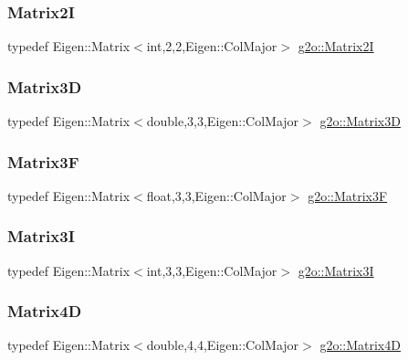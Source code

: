 \subsubsection{\texorpdfstring{Matrix2I}{Matrix2I}}
{\footnotesize\ttfamily typedef Eigen\+::\+Matrix$<$int,2,2,Eigen\+::\+Col\+Major$>$ \mbox{\hyperlink{namespaceg2o_ac9319963099ff600cf7c6251d7e937e1}{g2o\+::\+Matrix2I}}}

\mbox{\label{namespaceg2o_ae968373755b3be75547f97573021dc8a}} 
\subsubsection{\texorpdfstring{Matrix3D}{Matrix3D}}
{\footnotesize\ttfamily typedef Eigen\+::\+Matrix$<$double,3,3,Eigen\+::\+Col\+Major$>$ \mbox{\hyperlink{namespaceg2o_ae968373755b3be75547f97573021dc8a}{g2o\+::\+Matrix3D}}}

\mbox{\label{namespaceg2o_aff36b18c387a854e64af640ad5cb0bd7}} 
\subsubsection{\texorpdfstring{Matrix3F}{Matrix3F}}
{\footnotesize\ttfamily typedef Eigen\+::\+Matrix$<$float,3,3,Eigen\+::\+Col\+Major$>$ \mbox{\hyperlink{namespaceg2o_aff36b18c387a854e64af640ad5cb0bd7}{g2o\+::\+Matrix3F}}}

\mbox{\label{namespaceg2o_ab8a98dad54fdc966987b61b750e03201}} 
\subsubsection{\texorpdfstring{Matrix3I}{Matrix3I}}
{\footnotesize\ttfamily typedef Eigen\+::\+Matrix$<$int,3,3,Eigen\+::\+Col\+Major$>$ \mbox{\hyperlink{namespaceg2o_ab8a98dad54fdc966987b61b750e03201}{g2o\+::\+Matrix3I}}}

\mbox{\label{namespaceg2o_aed3721c4efdc0f727e94569cc22ddd42}} 
\subsubsection{\texorpdfstring{Matrix4D}{Matrix4D}}
{\footnotesize\ttfamily typedef Eigen\+::\+Matrix$<$double,4,4,Eigen\+::\+Col\+Major$>$ \mbox{\hyperlink{namespaceg2o_aed3721c4efdc0f727e94569cc22ddd42}{g2o\+::\+Matrix4D}}}

